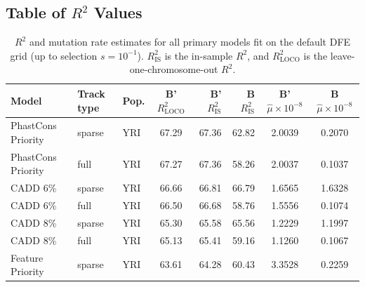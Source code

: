 \documentclass[11pt]{article}
\begin{document}
\subsection{Table of $R^2$ Values}
\label{supp:tbl-r2}
\begin{table}
\centering

\caption{$R^2$ and mutation rate estimates for all primary models fit on the
default DFE grid (up to selection $s=10^{-1}$). $R_\text{IS}^2$ is the
in-sample $R^2$, and $R_\text{LOCO}^2$ is the leave-one-chromosome-out $R^2$.}

\begin{tabular}{lll|crr|cc}
    \textbf{Model} & \textbf{Track type} & \textbf{Pop.} & \textbf{B' $R_\text{LOCO}^2$} & \textbf{B' $R_\text{IS}^2$} & \textbf{B $R_\text{IS}^2$} & \textbf{B' $\hat{\mu} \times 10^{-8}$} & \textbf{B $\hat{\mu} \times 10^{-8}$} \\[0.5ex] 
\hline
\hline
PhastCons Priority &            sparse &          YRI &                        67.29 &             67.36 &            62.82 &                                 2.0039 &                                0.2070 \\
PhastCons Priority &              full &          YRI &                        67.27 &             67.36 &            58.26 &                                 2.0037 &                                0.1037 \\
          CADD 6\% &            sparse &          YRI &                        66.66 &             66.81 &            66.79 &                                 1.6565 &                                1.6328 \\
          CADD 6\% &              full &          YRI &                        66.50 &             66.68 &            58.76 &                                 1.5556 &                                0.1074 \\
          CADD 8\% &            sparse &          YRI &                        65.30 &             65.58 &            65.56 &                                 1.2229 &                                1.1997 \\
          CADD 8\% &              full &          YRI &                        65.13 &             65.41 &            59.16 &                                 1.1260 &                                0.1067 \\
  Feature Priority &            sparse &          YRI &                        63.61 &             64.28 &            60.43 &                                 3.3528 &                                0.2259 \\

\end{tabular}
\end{table}
\end{document}
